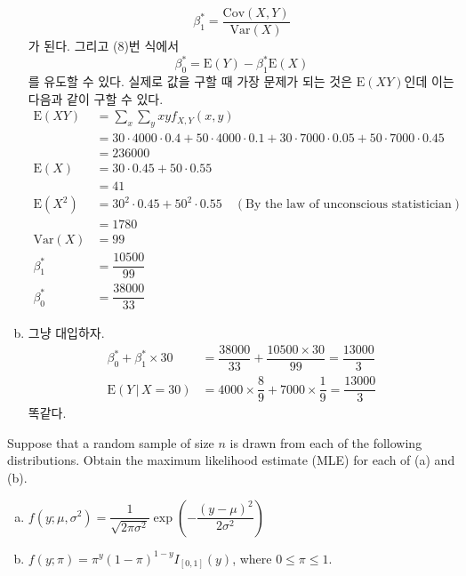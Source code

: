 \documentclass[answers]{exam}
\begin{document}
\begin{questions}
\begin{solution}
\begin{enumerate}[(a)]
\begin{equation}
        \beta_{1}^{*} = \dfrac{\mathrm{Cov}\left(X,Y\right)}{\mathrm{Var}\left(X\right)}
      \end{equation}
      가 된다. 그리고 (8)번 식에서
      \begin{equation}
        \beta_{0}^{*} = \mathrm{E}\left(Y\right)-\beta_{1}^{*}\mathrm{E}\left(X\right)
      \end{equation}
      를 유도할 수 있다. 실제로 값을 구할 때 가장 문제가 되는 것은 $\mathrm{E}\left(XY\right)$인데 이는 다음과 같이 구할 수 있다.
      \begin{align}
        \mathrm{E}\left(XY\right)&= \sum_{x}\sum_{y}xyf_{X,Y}\left(x,y\right)\\
        &= 30\cdot 4000\cdot 0.4+50\cdot 4000\cdot 0.1+30\cdot 7000\cdot 0.05 +50\cdot 7000\cdot 0.45\\
        &= 236000\\
        \mathrm{E}\left(X\right) &= 30\cdot 0.45+50\cdot 0.55\\
        &=41\\
        \mathrm{E}\left(X^{2}\right) &= 30^{2}\cdot 0.45+50^{2}\cdot 0.55\quad (\text{By the law of unconscious statistician})\\
        &= 1780\\
        \mathrm{Var}\left(X\right)&=99\\
        \beta_{1}^{*} &= \dfrac{10500}{99}\\
        \beta_{0}^{*} &= \dfrac{38000}{33}
      \end{align}
      \item 그냥 대입하자.
      \begin{align}
        \beta_{0}^{*}+\beta_{1}^{*}\times 30 &= \dfrac{38000}{33}+\dfrac{10500\times 30}{99} = \dfrac{13000}{3}\\
        \mathrm{E}\left(Y\,|\,X=30\right) &= 4000\times\dfrac{8}{9}+7000\times\dfrac{1}{9}=\dfrac{13000}{3}
      \end{align}
      똑같다.
    \end{enumerate}
   \end{solution}
   \question
   Suppose that a random sample of size $n$ is drawn from each of the following distributions. Obtain the maximum likelihood estimate (MLE) for each of (a) and (b).
   \begin{enumerate}[(a)]
    \item $f\left(y;\mu,\sigma^{2}\right)=\dfrac{1}{\sqrt{2\pi\sigma^{2}}}\exp\left(-\dfrac{\left(y-\mu\right)^{2}}{2\sigma^{2}}\right)$
    \item $f\left(y;\pi\right)=\pi^{y}\left(1-\pi\right)^{1-y}I_{\left[0,1\right]}\left(y\right)$, where $0\leq \pi \leq 1$.

\end{enumerate}
\end{questions}
\end{document}
